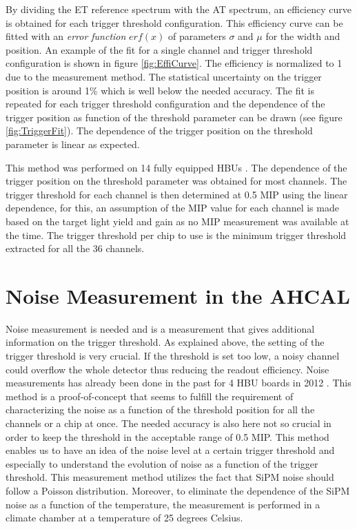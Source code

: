 By dividing the ET reference spectrum with the AT spectrum, an efficiency curve is obtained for each trigger threshold configuration. This efficiency curve can be fitted with an \textit{error function} $erf(x)$ of parameters $\sigma$ and $\mu$ for the width and position. An example of the fit for a single channel and trigger threshold configuration is shown in figure \ref{fig:EffiCurve}. The efficiency is normalized to 1 due to the measurement method. The statistical uncertainty on the trigger position is around 1\% which is well below the needed accuracy. The fit is repeated for each trigger threshold configuration and the dependence of the trigger position as function of the threshold parameter can be drawn (see figure \ref{fig:TriggerFit}). The dependence of the trigger position on the threshold parameter is linear as expected.

This method was performed on 14 fully equipped HBUs \cite{LloydTrigger}. The dependence of the trigger position on the threshold parameter was obtained for most channels. The trigger threshold for each channel is then determined at 0.5 MIP using the linear dependence, for this, an assumption of the MIP value for each channel is made based on the target light yield and gain as no MIP measurement was available at the time. The trigger threshold per chip to use is the minimum trigger threshold extracted for all the 36 channels.

\section{Noise Measurement in the AHCAL}

Noise measurement is needed and is a measurement that gives additional information on the trigger threshold. As explained above, the setting of the trigger threshold is very crucial. If the threshold is set too low, a noisy channel could overflow the whole detector thus reducing the readout efficiency. Noise measurements has already been done in the past for 4 HBU boards in 2012 \cite{Hermberg:2015gaa}. This method is a proof-of-concept that seems to fulfill the requirement of characterizing the noise as a function of the threshold position for all the channels or a chip at once. The needed accuracy is also here not so crucial in order to keep the threshold in the acceptable range of 0.5 MIP. This method enables us to have an idea of the noise level at a certain trigger threshold and especially to understand the evolution of noise as a function of the trigger threshold. This measurement method utilizes the fact that SiPM noise should follow a Poisson distribution. Moreover, to eliminate the dependence of the SiPM noise as a function of the temperature, the measurement is performed in a climate chamber at a temperature of 25 degrees Celsius.

